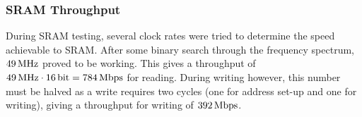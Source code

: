 \subsubsection{SRAM Throughput} \label{subsec:SramThroughput}
During SRAM testing, several clock rates were tried to determine the speed achievable to SRAM.
After some binary search through the frequency spectrum, $\unit[49]{MHz}$ proved to be working.
This gives a throughput of $\unit[49]{MHz}\cdot\unit[16]{bit} = \unit[784]{Mbps}$ for reading.
During writing however, this number must be halved as a write requires two cycles (one for address set-up and one for writing), giving a throughput for writing of $\unit[392]{Mbps}$.
